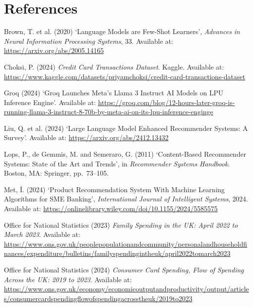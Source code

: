 \chapter*{References}

\begin{description}
\setlength{\itemsep}{0.8em}

\item Brown, T. et al. (2020) `Language Models are Few-Shot Learners', \textit{Advances in Neural Information Processing Systems}, 33. Available at: \url{https://arxiv.org/abs/2005.14165}

\item Choksi, P. (2024) \textit{Credit Card Transactions Dataset}. Kaggle. Available at: \url{https://www.kaggle.com/datasets/priyamchoksi/credit-card-transactions-dataset}

\item Groq (2024) `Groq Launches Meta's Llama 3 Instruct AI Models on LPU Inference Engine'. Available at: \url{https://groq.com/blog/12-hours-later-groq-is-running-llama-3-instruct-8-70b-by-meta-ai-on-its-lpu-inference-enginge}

\item Liu, Q. et al. (2024) `Large Language Model Enhanced Recommender Systems: A Survey'. Available at: \url{https://arxiv.org/abs/2412.13432}

\item Lops, P., de Gemmis, M. and Semeraro, G. (2011) `Content-Based Recommender Systems: State of the Art and Trends', in \textit{Recommender Systems Handbook}. Boston, MA: Springer, pp.\ 73--105.

\item Met, İ. (2024) `Product Recommendation System With Machine Learning Algorithms for SME Banking', \textit{International Journal of Intelligent Systems}, 2024. Available at: \url{https://onlinelibrary.wiley.com/doi/10.1155/2024/5585575}

\item Office for National Statistics (2023) \textit{Family Spending in the UK: April 2022 to March 2023}. Available at: \url{https://www.ons.gov.uk/peoplepopulationandcommunity/personalandhouseholdfinances/expenditure/bulletins/familyspendingintheuk/april2022tomarch2023}

\item Office for National Statistics (2024) \textit{Consumer Card Spending, Flow of Spending Across the UK: 2019 to 2023}. Available at: \url{https://www.ons.gov.uk/economy/economicoutputandproductivity/output/articles/consumercardspendingflowofspendingacrosstheuk/2019to2023}


\end{description}
